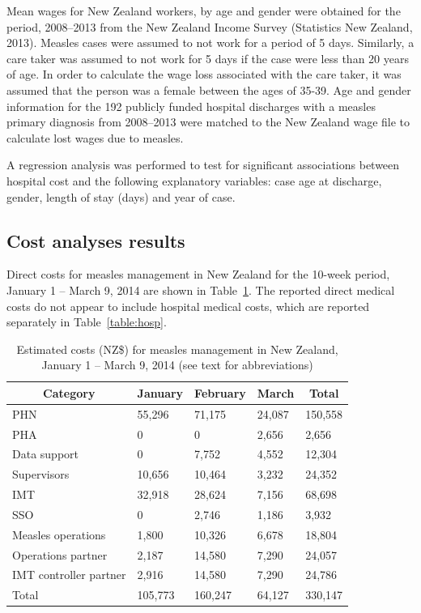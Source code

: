 \documentclass{article}
\begin{document}
Mean wages for New Zealand workers, by age and gender were obtained for the period, 2008--2013 from the New Zealand Income Survey (Statistics New Zealand, 2013). Measles cases were assumed to not work for a period of 5 days. Similarly, a care taker was assumed to not work for 5 days if the case were less than 20 years of age. In order to calculate the wage loss associated with the care taker, it was assumed that the person was a female between the ages of 35-39. Age and gender information for the 192 publicly funded hospital discharges with a measles primary diagnosis from 2008--2013 were matched to the New Zealand wage file to calculate lost wages due to measles.

A regression analysis was performed to test for significant associations between hospital cost and the following explanatory variables: case age at discharge, gender, length of stay (days) and year of case.

\subsection{Cost analyses results}

Direct costs for measles management in New Zealand for the 10-week period, January 1 -- March 9, 2014 are shown in  Table~\ref{table:direct}. The reported direct medical costs do not appear to include hospital medical costs, which are reported separately in Table~\ref{table:hosp}. 


\begin{table}
\caption{Estimated costs (NZ\$) for measles management in New Zealand, January 1 -- March 9, 2014 (see text for abbreviations)}
\begin{center}
\begin{tabular}{lllll}
\hline\hline
\multicolumn{1}{c}{Category}&\multicolumn{1}{c}{January}&\multicolumn{1}{c}{February}&\multicolumn{1}{c}{March}&\multicolumn{1}{c}{Total}\tabularnewline
\hline
PHN&55,296&71,175&24,087&150,558\tabularnewline
PHA&0&0&2,656&2,656\tabularnewline
Data support&0&7,752&4,552&12,304\tabularnewline
Supervisors&10,656&10,464&3,232&24,352\tabularnewline
IMT&32,918&28,624&7,156&68,698\tabularnewline
SSO&0&2,746&1,186&3,932\tabularnewline
Measles operations&1,800&10,326&6,678&18,804\tabularnewline
Operations partner&2,187&14,580&7,290&24,057\tabularnewline
IMT controller partner&2,916&14,580&7,290&24,786\tabularnewline
Total&105,773&160,247&64,127&330,147\tabularnewline
\hline
\end{tabular}\end{center}\label{table:direct}
\end{table}
\end{document}
